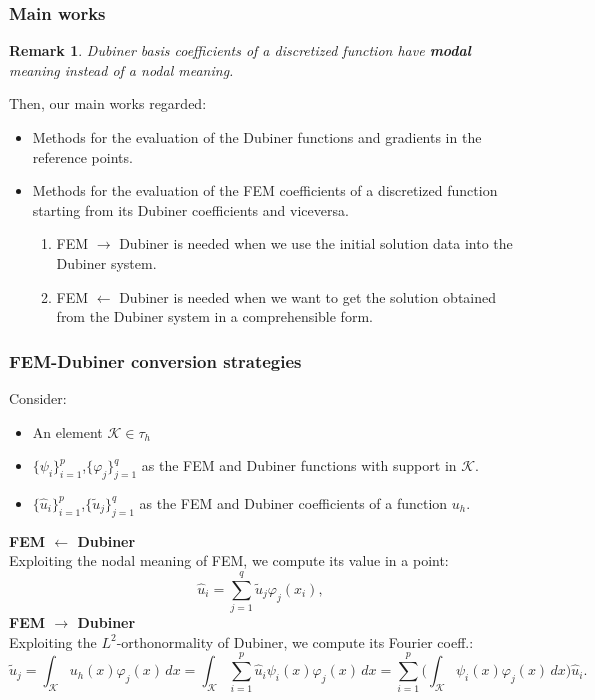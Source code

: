 \documentclass[9pt]{beamer}
\newtheorem*{remark}{Remark}
\begin{document}
\begin{frame}
\frametitle{Main works}
\begin{remark}
	Dubiner basis coefficients of a discretized function have \textbf{modal} meaning instead of a \emph{nodal} meaning.
\end{remark}
Then, our main works regarded:
\begin{itemize}
	\item Methods for the evaluation of the Dubiner functions and gradients in the reference points.
	\item Methods for the evaluation of the FEM coefficients of a discretized function starting from its Dubiner coefficients and viceversa.
	\begin{enumerate}
		\item FEM $\rightarrow$ Dubiner is needed when we use the initial solution data into the Dubiner system.
		\item FEM $\leftarrow$ Dubiner is needed when we want to get the solution obtained from the Dubiner system in a comprehensible form. 
	\end{enumerate}
\end{itemize}
\end{frame}


\begin{frame}
\frametitle{FEM-Dubiner conversion strategies}
Consider:
\begin{itemize}
	\small
	\item An element $\mathcal{K}\in \tau_h$
	\item $\{\psi_{i}\}_{i=1}^{p}$,$\{\varphi_{j}\}_{j=1}^{q}$ as the FEM and Dubiner functions with support in $\mathcal{K}$. 
	\item $\{\hat{u}_i\}_{i=1}^p$,$\{\tilde{u}_j\}_{j=1}^q$ as the FEM and Dubiner coefficients of a function $u_h$.
\end{itemize} \vspace{4mm}
\textbf{FEM $\leftarrow$ Dubiner} \\
Exploiting the nodal meaning of FEM, we compute its value in a point:
\begin{equation*} \label{ref3}
\hat{u}_i = \sum_{j=1}^q \tilde{u}_j\varphi_j(x_i),
\end{equation*}
\textbf{FEM $\rightarrow$ Dubiner} \\
Exploiting the $L^2$-orthonormality of Dubiner, we compute its Fourier coeff.:
\begin{equation*}\label{ref4}
\tilde{u}_j = \int_\mathcal{K} u_h(x) \varphi_j(x) \,dx = \int_{\mathcal{K}} \sum_{i=1}^p \hat{u}_i\psi_i(x) \varphi_j(x) \,dx = \sum_{i=1}^p \Big(\int_{\mathcal{K}}\psi_i(x)\varphi_j(x)\,dx \Big) \hat{u}_i.
\end{equation*}
\end{frame}
\end{document}
